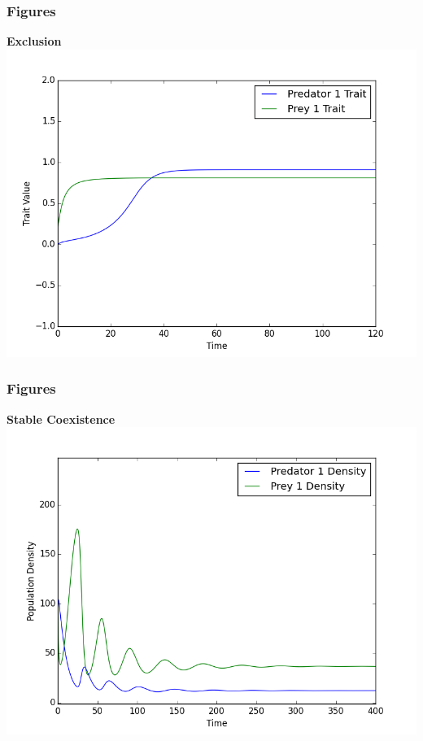 \documentclass[10pt]{beamer}
\begin{document}
\begin{frame}
	\frametitle{Figures}
	{\bf Exclusion}
	\includegraphics[scale=0.5]{figures/1x1/traits_exclusion.png}
\end{frame}
\begin{frame}
	\frametitle{Figures}
	{\bf Stable Coexistence}
	\includegraphics[scale=0.5]{figures/1x1/densities_stable_coexistence.png}
\end{frame}
\end{document}
